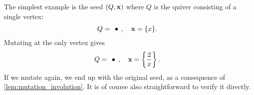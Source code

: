 \begin{example}
	The simplest example is the seed $(Q, \mathbf{x})$ where $Q$ is the quiver consisting of a single vertex:
	\begin{equation*}
		Q = \begin{tikzcd}
			\bullet
		\end{tikzcd},
		\quad \bx = \{x\}.
	\end{equation*}
	Mutating at the only vertex gives
	\begin{equation*}
		Q = \begin{tikzcd}
			\bullet
		\end{tikzcd},
		\quad \bx = \left\{\frac{2}{x}\right\}.
	\end{equation*}
	If we mutate again, we end up with the original seed, as a consequence of
	\cref{lem:mutation_involution}. It is of course also straightforward to verify it
	directly.
\end{example}
